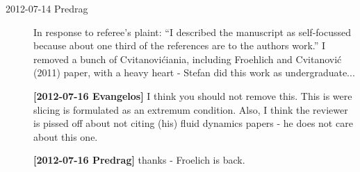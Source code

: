 \begin{description}

\item[2012-07-14 Predrag] In response to referee's plaint:
``I described the manuscript as self-focussed because about one third of
the references are to the authors work.'' I removed a bunch of
Cvitanovi\'ciania, including Froehlich and Cvitanovi\'c (2011) paper, with
a heavy heart - Stefan did this work as undergraduate...

{\bf [2012-07-16 Evangelos]} I think you should not remove this. This is were
		slicing is formulated as an extremum condition. Also,
		I think the reviewer is pissed off about not citing (his)
		fluid dynamics papers - he does not care about this one.

{\bf [2012-07-16 Predrag]} thanks - Froelich is back.


\end{description}
